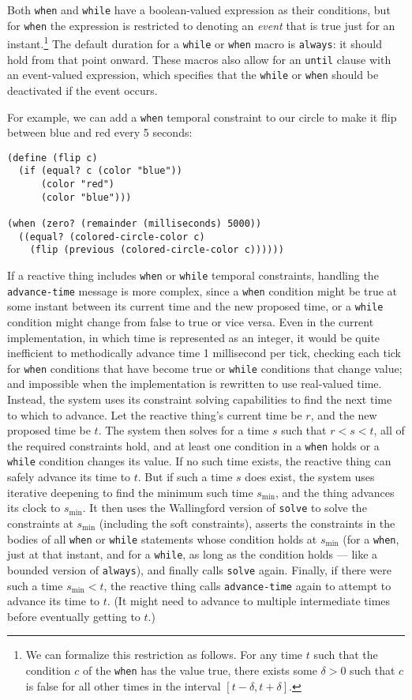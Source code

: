 \documentclass[reprint]{sigplanconf}
\begin{document}
Both \verb|when| and \verb|while| have a boolean-valued expression as their
conditions, but for \verb|when| the expression is restricted to denoting an
\emph{event} that is true just for an instant.\footnote{We can formalize
  this restriction as follows.  For any time $t$ such that the condition
  $c$ of the {\tt when} has the value true, there exists some $\delta>0$
  such that $c$ is false for all other times in the interval
  $[t-\delta,t+\delta]$.}  The default duration for a \verb|while| or
\verb|when| macro is \verb|always|: it should hold from that point onward.
These macros also allow for an \verb|until| clause with an event-valued
expression, which specifies that the \verb|while| or \verb|when| should be
deactivated if the event occurs.

For example, we can add a \verb|when| temporal constraint to our 
circle to make it flip between blue and red every 5 seconds:

\begin{verbatim}
(define (flip c)
  (if (equal? c (color "blue"))
      (color "red")
      (color "blue")))

(when (zero? (remainder (milliseconds) 5000))
  ((equal? (colored-circle-color c) 
    (flip (previous (colored-circle-color c))))))
\end{verbatim}

If a reactive thing includes \verb|when| or \verb|while| temporal
constraints, handling the \verb|advance-time| message is more complex,
since a \verb|when| condition might be true at some instant between
its current time and the new proposed time, or a \verb|while|
condition might change from false to true or vice versa.  Even in the
current implementation, in which time is represented as an integer, it
would be quite inefficient to methodically advance time 1 millisecond
per tick, checking each tick for \verb|when| conditions that have
become true or \verb|while| conditions that change value; and
impossible when the implementation is rewritten to use real-valued
time.  Instead, the system uses its constraint solving capabilities to
find the next time to which to advance.  Let the reactive thing's
current time be $r$, and the new proposed time be $t$\@.  The system
then solves for a time $s$ such that $r<s<t$, all of the required
constraints hold, and at least one condition in a \verb|when| holds or
a \verb|while| condition changes its value.  If no such time exists,
the reactive thing can safely advance its time to $t$\@.  But if such
a time $s$ does exist, the system uses iterative deepening to find the
minimum such time $s_{\min}$, and the thing advances its clock to
$s_{\min}$.  It then uses the Wallingford version of \verb|solve| to
solve the constraints at $s_{\min}$ (including the soft constraints),
asserts the constraints in the bodies of all \verb|when| or
\verb|while| statements whose condition holds at $s_{\min}$ (for a
\verb|when|, just at that instant, and for a \verb|while|, as long as
the condition holds --- like a bounded version of \verb|always|), and
finally calls \verb|solve| again.  Finally, if there were such a time
$s_{\min}<t$, the reactive thing calls \verb|advance-time| again to
attempt to advance its time to $t$\@.  (It might need to advance to
multiple intermediate times before eventually getting to $t$.)
\end{document}
